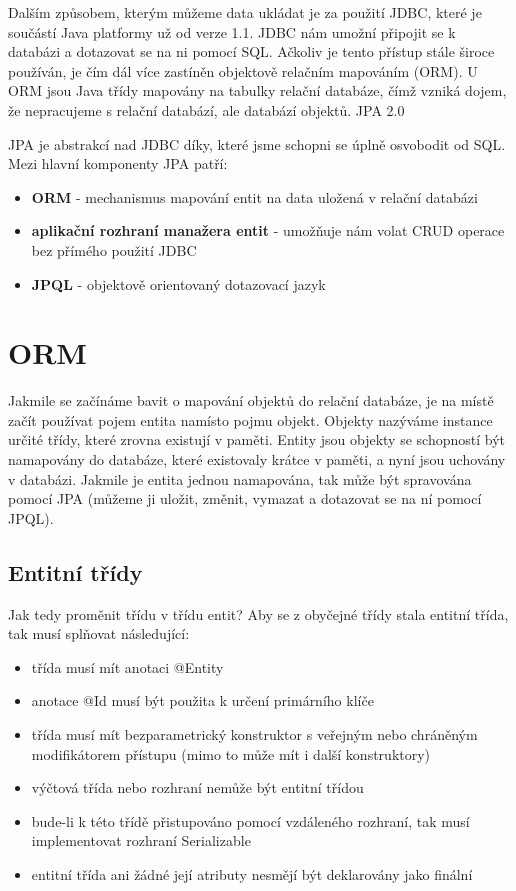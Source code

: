 \documentclass[122pt,oneside]{fithesis}
\begin{document}
Dalším způsobem, kterým můžeme data ukládat je za použití JDBC, které je součástí Java platformy už od verze 1.1. JDBC nám umožní připojit se k databázi a dotazovat se na ni pomocí SQL. Ačkoliv je tento přístup stále široce používán, je čím dál více zastíněn objektově relačním mapováním (ORM). U ORM jsou Java třídy mapovány na tabulky relační databáze, čímž vzniká dojem, že nepracujeme s relační databází, ale databází objektů.
JPA 2.0

JPA je abstrakcí nad JDBC díky, které jsme schopni se úplně osvobodit od SQL. Mezi hlavní komponenty JPA patří:

\begin{itemize}
  \item{\bf ORM} - mechanismus mapování entit na data uložená v relační databázi 
  \item{\bf aplikační rozhraní manažera entit} - umožňuje nám volat CRUD operace bez přímého použití JDBC
  \item{\bf JPQL} - objektově orientovaný dotazovací jazyk
\end{itemize}

\section{ORM}
Jakmile se začínáme bavit o mapování objektů do relační databáze, je na místě začít používat pojem entita namísto pojmu objekt. Objekty nazýváme instance určité třídy, které zrovna existují v paměti. Entity jsou objekty se schopností být namapovány do databáze, které existovaly krátce v paměti, a nyní jsou uchovány v databázi. Jakmile je entita jednou namapována, tak může být spravována pomocí JPA (můžeme ji uložit, změnit, vymazat a dotazovat se na ní pomocí JPQL).

\subsection{Entitní třídy}
Jak tedy proměnit třídu v třídu entit? Aby se z obyčejné třídy stala entitní třída, tak musí splňovat následující:
\begin{itemize}
  \item třída musí mít anotaci @Entity
  \item anotace @Id musí být použita k určení primárního klíče
  \item třída musí mít bezparametrický konstruktor s veřejným nebo chráněným modifikátorem přístupu (mimo to může mít i další konstruktory)
  \item výčtová třída nebo rozhraní nemůže být entitní třídou
  \item bude-li k této třídě přistupováno pomocí vzdáleného rozhraní, tak musí implementovat rozhraní Serializable
  \item entitní třída ani žádné její atributy nesmějí být deklarovány jako finální
\end{itemize}
\end{document}
